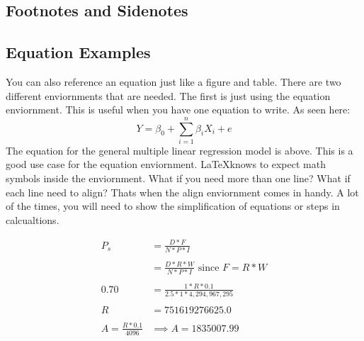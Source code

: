 \documentclass[./dissertation.tex]{subfiles}
\begin{document}
      \subsection{Footnotes and Sidenotes}



      \subsection{Equation Examples}
        You can also reference an equation just like a figure and table. There are two different enviornments that are needed. The first is just using the equation enviornment. This is useful when you have one equation to write. As seen here:
          \begin{equation*}
            Y=\beta_{0} + \sum\limits_{i=1}^n \beta_{i}X_{i} + e
          \end{equation*}
        The equation for the general multiple linear regression model is above. This is a good use case for the equation enviornment. \LaTeX knows to expect math symbols inside the enviornment. What if you need more than one line? What if each line need to align? Thats when the align enviornment comes in handy. A lot of the times, you will need to show the simplification of equations or steps in calcualtions.
          \begin{center}
            \begin{align*}
              P_{s} &= \frac{D*F}{N*P*I}\\
                            \\
              &= \frac{D*R*W}{N*P*I} \text{  since } F=R*W\\
                      \\
              0.70 &= \frac{1*R*0.1}{2.5*1*4,294,967,295}\\
                      \\
             R &= 751619276625.0 \\
             \\
             A=\frac{R*0.1}{4096} &\implies A = 1835007.99
           \end{align*}
         \end{center}
\end{document}
